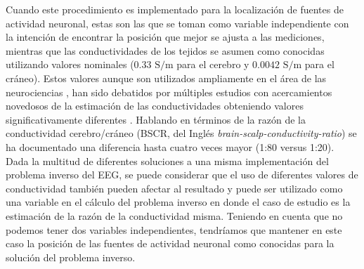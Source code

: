 Cuando este procedimiento es implementado para la localización de fuentes de actividad neuronal, estas son las que se toman como variable independiente con la intención de encontrar la posición que mejor se ajusta a las mediciones, mientras que las conductividades de los tejidos se asumen como conocidas utilizando valores nominales ($0.33\text{ S/m}$ para el cerebro y $0.0042 \text{ S/m}$ para el cráneo).
Estos valores aunque son utilizados ampliamente en el área de las neurociencias \cite{Rush1968,Rush1969,Cohen1983}, han sido debatidos por múltiples estudios con acercamientos novedosos de la estimación de las conductividades obteniendo valores significativamente diferentes \cite{McCann2019}.
Hablando en términos de la razón de la conductividad cerebro/cráneo (BSCR, del Inglés \emph{brain-scalp-conductivity-ratio}) se ha documentado una diferencia hasta cuatro veces mayor (1:80 versus 1:20).
Dada la multitud de diferentes soluciones a una misma implementación del problema inverso del EEG, se puede considerar que el uso de diferentes valores de conductividad también pueden afectar al resultado y puede ser utilizado como una variable en el cálculo del problema inverso en donde el caso de estudio es la estimación de la razón de la conductividad misma. 
Teniendo en cuenta que no podemos tener dos variables independientes, tendríamos que mantener en este caso la posición de las fuentes de actividad neuronal como conocidas para la solución del problema inverso.